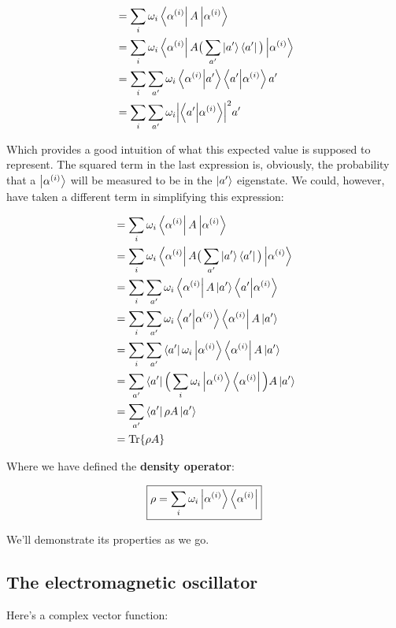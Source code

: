 \documentclass[12pt,a4paper]{report}
\begin{document}
\begin{align}
    [A] &=\sum_{i}\omega_i\bra{\alpha^{(i)}}A\ket{\alpha^{(i)}}\\
    &=\sum_{i}\omega_i\bra{\alpha^{(i)}}A\big(\sum_{a'}\ket{a'}\bra{a'}\big)\ket{\alpha^{(i)}}\\
    &=\sum_{i}\sum_{a'}\omega_i\bra{\alpha^{(i)}}\ket{a'}\bra{a'}\ket{\alpha^{(i)}}a'\\
    &=\sum_{i}\sum_{a'}\omega_i\abs{\braket{a'}{\alpha^{(i)}}}^2a'
\end{align}

Which provides a good intuition of what this expected value is supposed to represent. The squared term in the last expression is, obviously, the probability that a $\ket{\alpha^{(i)}}$ will be measured to be in the $\ket{a'}$ eigenstate. We could, however, have taken a different term in simplifying this expression:

\begin{align}
    [A] &=\sum_{i}\omega_i\bra{\alpha^{(i)}}A\ket{\alpha^{(i)}}\\
    &=\sum_{i}\omega_i\bra{\alpha^{(i)}}A\big(\sum_{a'}\ket{a'}\bra{a'}\big)\ket{\alpha^{(i)}}\\
    &=\sum_{i}\sum_{a'}\omega_i\bra{\alpha^{(i)}}A\ket{a'}\bra{a'}\ket{\alpha^{(i)}}\\
    &=\sum_{i}\sum_{a'}\omega_i\bra{a'}\ket{\alpha^{(i)}}\bra{\alpha^{(i)}}A\ket{a'}\\
    &=\sum_{i}\sum_{a'}\bra{a'}\omega_i\ket{\alpha^{(i)}}\bra{\alpha^{(i)}}A\ket{a'}\\
    &=\sum_{a'}\bra{a'}\Big(\sum_{i}\omega_i\ket{\alpha^{(i)}}\bra{\alpha^{(i)}}\Big)A\ket{a'}\\
    &=\sum_{a'}\bra{a'}\rho A\ket{a'}\\
    &=\Tr{\rho A}
\end{align}

Where we have defined the \textbf{density operator}:

\begin{equation}
    \boxed{\rho=\sum_{i}\omega_i\ket{\alpha^{(i)}}\bra{\alpha^{(i)}}}
\end{equation}

We'll demonstrate its properties as we go.

\subsection{The electromagnetic oscillator}

Here's a complex vector function:
\end{document}
